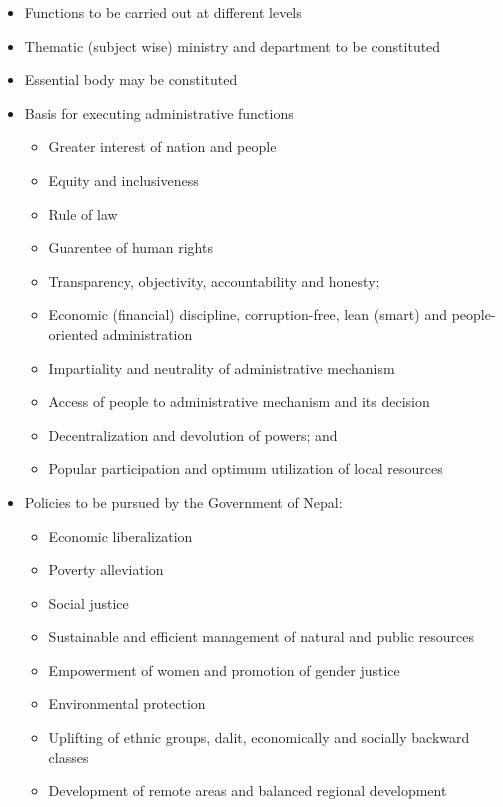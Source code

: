 \documentclass[
  openany]{book}
\begin{document}
\begin{itemize}
  \item Functions to be carried out at different levels
  \item Thematic (subject wise) ministry and department to be constituted
  \item Essential body may be constituted
  \item Basis for executing administrative functions
    \begin{itemize}
    \item Greater interest of nation and people
    \item Equity and inclusiveness
    \item Rule of law
    \item Guarentee of human rights
    \item Transparency, objectivity, accountability and honesty;
    \item Economic (financial) discipline, corruption-free, lean (smart) and people-oriented administration
    \item Impartiality and neutrality of administrative mechanism
    \item Access of people to administrative mechanism and its decision
    \item Decentralization and devolution of powers; and
    \item Popular participation and optimum utilization of local resources
    \end{itemize}
  \item Policies to be pursued by the Government of Nepal:
    \begin{itemize}
    \item Economic liberalization
    \item Poverty alleviation
    \item Social justice
    \item Sustainable and efficient management of natural and public resources
    \item Empowerment of women and promotion of gender justice
    \item Environmental protection
    \item Uplifting of ethnic groups, dalit, economically and socially backward classes
    \item Development of remote areas and balanced regional development
    \end{itemize}
  \end{itemize}
\end{document}
